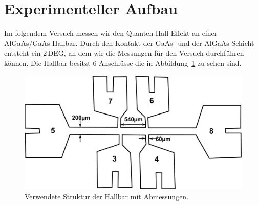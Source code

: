 \documentclass[paper=a4,fontsize=10pt,DIV=18,twocolumn,parskip=half]{scrartcl}
\numberwithin{equation}{section}    %
\begin{document}

%
\section{Experimenteller Aufbau}
\label{Experiment}
%
Im folgendem Versuch messen wir den Quanten-Hall-Effekt an einer AlGaAs/GaAs Hallbar. Durch den Kontakt der GaAs- und der AlGaAs-Schicht entsteht ein 2\,DEG, an dem wir die Messungen für den Versuch durchführen können. Die Hallbar besitzt 6 Anschlüsse die in Abbildung~\ref{fig.hallbar} zu sehen sind. 

\begin{figure}[htp]
	\begin{center}
		\includegraphics[width=.8\columnwidth]{Bilder/hallbar.pdf}
		\caption{Verwendete Struktur der Hallbar mit Abmessungen.}
		\label{fig.hallbar}
	\end{center}
\end{figure}
\end{document}
